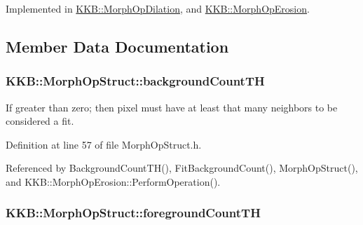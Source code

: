 Implemented in \hyperlink{class_k_k_b_1_1_morph_op_dilation_a9240afda29b2a87de63fbd581bd999c0}{K\+K\+B\+::\+Morph\+Op\+Dilation}, and \hyperlink{class_k_k_b_1_1_morph_op_erosion_a1cee95de95d4ebc3616631a41d80d23e}{K\+K\+B\+::\+Morph\+Op\+Erosion}.



\subsection{Member Data Documentation}
\subsubsection[{\texorpdfstring{background\+Count\+TH}{backgroundCountTH}}]{ K\+K\+B\+::\+Morph\+Op\+Struct\+::background\+Count\+TH\hspace{0.3cm}{\ttfamily [protected]}}\hypertarget{class_k_k_b_1_1_morph_op_struct_a7c4f6928cb355035d1fb3aa5ddac2601}{}\label{class_k_k_b_1_1_morph_op_struct_a7c4f6928cb355035d1fb3aa5ddac2601}
If greater than zero; then pixel must have at least that many neighbors to be considered a fit. 

Definition at line 57 of file Morph\+Op\+Struct.\+h.



Referenced by Background\+Count\+T\+H(), Fit\+Background\+Count(), Morph\+Op\+Struct(), and K\+K\+B\+::\+Morph\+Op\+Erosion\+::\+Perform\+Operation().

\subsubsection[{\texorpdfstring{foreground\+Count\+TH}{foregroundCountTH}}]{ K\+K\+B\+::\+Morph\+Op\+Struct\+::foreground\+Count\+TH\hspace{0.3cm}{\ttfamily [protected]}}\hypertarget{class_k_k_b_1_1_morph_op_struct_a2f707b6f25d89d1aa84ed826a94ee64d}{}\label{class_k_k_b_1_1_morph_op_struct_a2f707b6f25d89d1aa84ed826a94ee64d}



